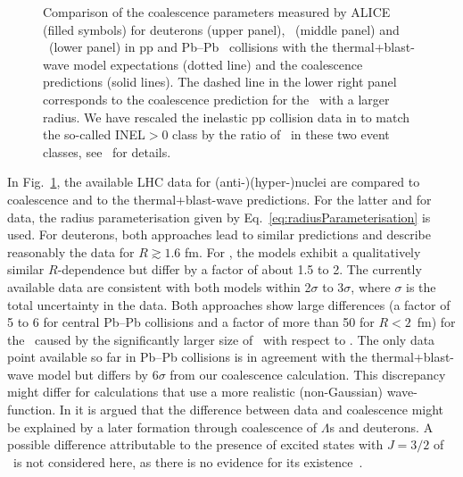 \documentclass[%
 reprint,
 amsmath,amssymb,
 aps,
]{revtex4-1}
\begin{document}
\begin{figure}[!h]
\begin{center}
		\caption{Comparison of the coalescence parameters measured by ALICE (filled symbols) for deuterons (upper panel), \hethree\ (middle panel) and \hthreelambda\ (lower panel) in pp \cite{ALICE:nucleipp2017} and Pb--Pb~\cite{ALICE:deuteronppPbPb2015, Adam:2015yta} collisions with the  thermal+blast-wave model expectations (dotted line) and the coalescence predictions (solid lines). The dashed line in the lower right panel corresponds to the coalescence prediction for the \hthreelambda\ with a larger radius. We have rescaled the inelastic pp collision data in \cite{ALICE:nucleipp2017} to match the so-called INEL$>$0 class by the ratio of \avdNdeta~in these two event classes, see~\cite{Adam:2015gka} for details. 
		}
		\label{fig:CompareThermalAndCoalescence}
	\end{center}
\end{figure}

In Fig.~\ref{fig:CompareThermalAndCoalescence}, the available LHC data for \mbox{(anti-)(hyper-)nuclei} \cite{ALICE:nucleipp2017,ALICE:deuteronppPbPb2015,Adam:2015yta} are compared to coalescence and to the thermal+blast-wave predictions.
For the latter and for data, the radius parameterisation given by Eq.~\ref{eq:radiusParameterisation} is used.
For deuterons, both approaches lead to similar predictions and describe reasonably the data for $R \gtrsim 1.6$ fm. 
For \hethree, the models exhibit a qualitatively similar $R$-dependence but differ by a factor of about 1.5 to 2. 
The currently available data are consistent with both models within 2$\sigma$ to 3$\sigma$, where $\sigma$ is the total uncertainty in the data. 
Both approaches show large differences (a factor of 5 to 6 for central Pb--Pb collisions and a factor of more than 50 for $R < 2$~fm) for the \hthreelambda\ caused by the significantly larger size of \hthreelambda\ with respect to \hethree. 
The only data point available so far in Pb--Pb collisions is in agreement with the thermal+blast-wave model but differs by 6$\sigma$ from our coalescence calculation. This discrepancy might differ for calculations that use a more realistic (non-Gaussian) wave-function.
In \cite{Zhang:2018euf} it is argued that the difference between data and coalescence might be explained by a later formation through coalescence of $\Lambda$s and deuterons. 
A possible difference attributable to the presence of excited states with $J=3/2$ of \hthreelambda~is not considered here, as there is no evidence for its existence~\cite{Mart:1996ay}. 
\end{document}
